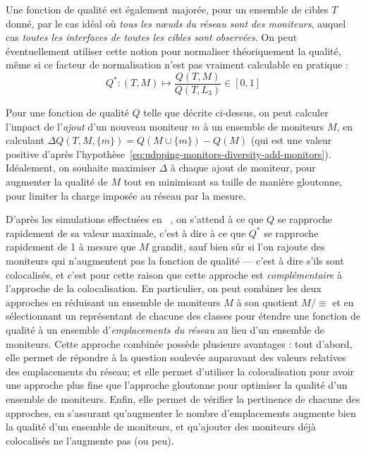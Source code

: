 Une fonction de qualité est également majorée, pour un ensemble de cibles
$T$ donné, par le cas idéal où \emph{tous les n\oe{}uds du réseau sont des
moniteurs}, auquel cas \emph{toutes les interfaces de toutes les cibles sont
observées}. On peut éventuellement utiliser cette notion pour normaliser
théoriquement la qualité, même si ce facteur de normalisation n'est pas vraiment
calculable en pratique :
$$Q^* : (T, M) \mapsto \frac{Q(T, M)}{Q(T, L_3)} \in [0, 1]$$

Pour une fonction de qualité $Q$ telle que décrite ci-dessus, on peut
calculer l'impact de l'\emph{ajout} d'un nouveau moniteur $m$ à un ensemble
de moniteurs $M$, en calculant $\Delta Q(T, M, \{ m \}) = Q(M \cup \{ m \}) -
Q(M)$ (qui est une valeur positive
d'après l'hypothèse~\ref{eq:udpping-monitors-diversity-add-monitors}).
Idéalement, on souhaite maximiser $\Delta$ à chaque ajout de moniteur, pour
augmenter la qualité de $M$ tout en minimisant sa taille de manière gloutonne,
pour limiter la charge imposée au réseau par la mesure.

D'après les simulations effectuées en
~, on s'attend à ce que $Q$ se rapproche
rapidement de sa valeur maximale, c'est à dire à ce que $Q^*$ se rapproche
rapidement de 1 à mesure que $M$ grandit, sauf bien sûr si l'on rajoute des
moniteurs qui n'augmentent pas la fonction de qualité --- c'est à dire s'ils
sont colocalisés, et c'est pour cette raison que cette approche est
\emph{complémentaire} à l'approche de la colocalisation. En particulier, on peut
combiner les deux approches en réduisant un ensemble de moniteurs $M$ à son
quotient $M/\equiv$ et en sélectionnant un représentant de chacune des classes
pour étendre une fonction de qualité à un ensemble d'\emph{emplacements du
réseau} au lieu d'un ensemble de moniteurs. Cette approche combinée possède
plusieurs avantages : tout d'abord, elle permet de répondre à la question
soulevée auparavant des valeurs relatives des emplacements du réseau; et elle permet
d'utiliser la colocalisation pour avoir une approche plus fine que l'approche
gloutonne pour optimiser la qualité d'un ensemble de moniteurs. Enfin, elle
permet de vérifier la pertinence de chacune des approches, en s'assurant
qu'augmenter le nombre d'emplacements augmente bien la qualité d'un ensemble de
moniteurs, et qu'ajouter des moniteurs déjà colocalisés ne l'augmente pas (ou
peu).

